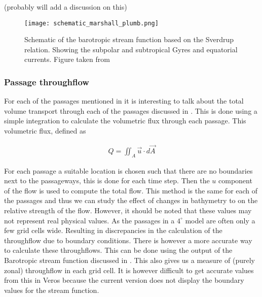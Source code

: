  
 (probably will add a discussion on this)
 
  \begin{figure}[H]
 	\texttt{[image: schematic\_marshall\_plumb.png]}
 	\caption{Schematic of the barotropic stream function based on the Sverdrup relation. Showing the subpolar and subtropical Gyres and equatorial currents. Figure taken from \cite{MarschallPlumb}}
 	\label{fig:schem_currents}
 \end{figure}
\subsubsection{Passage throughflow}\label{sec:throughflowp}
For each of the passages mentioned in  it is interesting to talk about the total volume transport through each of the passages discussed in . This is done using a simple integration to calculate the volumetric flux through each passage. This volumetric flux, defined as

\begin{align}
Q = \iint_A \vec{u} \cdot d\vec{A}
\end{align}	

For each passage a suitable location is chosen such that there are no boundaries next to the passageways, this is done for each time step. Then the $u$ component of the flow is used to compute the total flow. This method is the same for each of the passages and thus we can study the effect of changes in bathymetry to on the relative strength of the flow. However, it should be noted that these values may not represent real physical values. As the passages in a $4^{\circ}$ model are often only a few grid cells wide. Resulting in discrepancies in the calculation of the throughflow due to boundary conditions. 
There is however a more accurate way to calculate these throughflows. This can be done using the output of the Barotropic stream function discussed in . This also gives us a measure of (purely zonal) throughflow in each grid cell. It is however difficult to get accurate values from this in Veros because the current version does not display the boundary values for the stream function.


